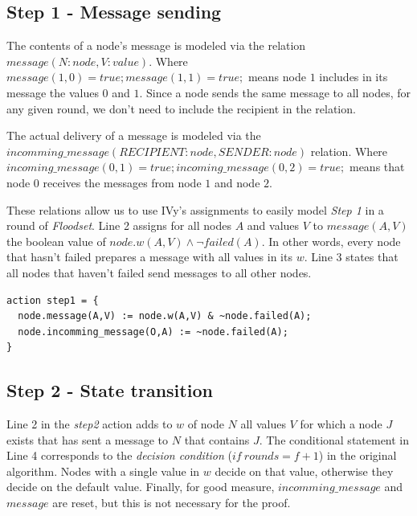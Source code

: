 \documentclass[fleqn]{article}
\begin{document}
\subsection{Step 1 - Message sending}
The contents of a node's message is modeled via the relation $message(N:node,V:value)$. Where
$message(1,0) = true; message(1,1) = true;$ means node $1$ includes in its message the values $0$ and $1$.
Since a node sends the same message to all nodes, for any given round, we don't need to include the
recipient in the relation.

The actual delivery of a message is modeled via the $incomming\_message(RECIPIENT:node,SENDER:node)$ relation. Where $incoming\_message(0,1) = true; incoming\_message(0,2) = true;$ means that node $0$ receives the messages from node $1$ and node $2$.

These relations allow us to use IVy's assignments to easily model \textit{Step 1} in a round of \textit{Floodset}.
Line 2 assigns for all nodes $A$ and values $V$ to $message(A,V)$ the boolean value of $node.w(A,V) \land \neg failed(A)$. In other words, every node that hasn't failed prepares a message with all values in its $w$. Line 3 states that all nodes that haven't failed send messages to all other nodes.

\begin{mdframed}[nobreak=true, backgroundcolor=light-gray, roundcorner=10pt,leftmargin=1, rightmargin=1, innerleftmargin=15, innertopmargin=15,innerbottommargin=15, outerlinewidth=1, linecolor=light-gray]
\begin{lstlisting}
action step1 = {
  node.message(A,V) := node.w(A,V) & ~node.failed(A);
  node.incomming_message(O,A) := ~node.failed(A);
}
\end{lstlisting}
\end{mdframed}

\subsection{Step 2 - State transition}

Line 2 in the \textit{step2} action adds to $w$ of node $N$ all values $V$ for which a node $J$ exists that has sent a message to $N$ that contains $J$.
The conditional statement in Line 4 corresponds to the \textit{decision condition} ($if\ rounds = f+1$) in the original algorithm. Nodes with a single value in $w$ decide on that value, otherwise
they decide on the default value.
Finally, for good measure, $incomming\_message$ and $message$ are reset, but this is not necessary for the proof.
\end{document}
